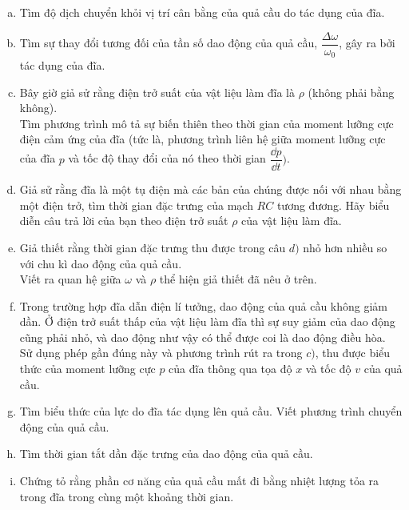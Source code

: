 \begin{vd}
\begin{enumerate}[1)]
\begin{center}
\end{center}
\begin{enumerate}[a)]
    \item Tìm độ dịch chuyển khỏi vị trí cân bằng của quả cầu do tác dụng của đĩa.
    \item Tìm sự thay đổi tương đối của tần số dao động của quả cầu, $\dfrac{\Delta \omega}{\omega_0}$, gây ra bởi tác dụng của đĩa.
    \item Bây giờ giả sử rằng điện trở suất của vật liệu làm đĩa là $\rho$ (không phải bằng không).\\
    Tìm phương trình mô tả sự biến thiên theo thời gian của moment lưỡng cực điện cảm ứng của đĩa (tức là, phương trình liên hệ giữa moment lưỡng cực của đĩa $p$ và tốc độ thay đổi của nó theo thời gian $\dfrac{\dd p}{\dd t})$.
    \item Giả sử rằng đĩa là một tụ điện mà các bản của chúng được nối với nhau bằng một điện trở, tìm thời gian đặc trưng của mạch $RC$ tương đương. Hãy biểu diễn câu trả lời của bạn theo điện trở suất $\rho$ của vật liệu làm đĩa.
    \item Giả thiết rằng thời gian đặc trưng thu được trong câu $d)$ nhỏ hơn nhiều so với chu kì dao động của quả cầu.\\
    Viết ra quan hệ giữa $\omega$ và $\rho$ thể hiện giả thiết đã nêu ở trên.
    \item Trong trường hợp đĩa dẫn điện lí tưởng, dao động của quả cầu không giảm dần. Ở điện trở suất thấp của vật liệu làm đĩa thì sự suy giảm của dao động cũng phải nhỏ, và dao động như vậy có thể được coi là dao động điều hòa.\\
    Sử dụng phép gần đúng này và phương trình rút ra trong $c)$, thu được biểu thức của moment lưỡng cực $p$ của đĩa thông qua tọa độ $x$ và tốc độ $v$ của quả cầu.
    \item Tìm biểu thức của lực do đĩa tác dụng lên quả cầu. Viết phương trình chuyển động của quả cầu.
    \item Tìm thời gian tắt dần đặc trưng của dao động của quả cầu.
    \item Chứng tỏ rằng phần cơ năng của quả cầu mất đi bằng nhiệt lượng tỏa ra trong đĩa trong cùng một khoảng thời gian.
\end{enumerate}
\end{enumerate}
\end{vd}
